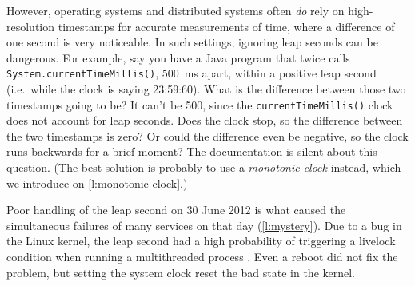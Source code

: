 However, operating systems and distributed systems often \emph{do} rely on high-resolution timestamps for accurate measurements of time, where a difference of one second is very noticeable.
In such settings, ignoring leap seconds can be dangerous.
For example, say you have a Java program that twice calls \verb|System.currentTimeMillis()|, 500~ms apart, within a positive leap second (i.e.\ while the clock is saying 23:59:60).
What is the difference between those two timestamps going to be?
It can't be 500, since the \verb|currentTimeMillis()| clock does not account for leap seconds.
Does the clock stop, so the difference between the two timestamps is zero?
Or could the difference even be negative, so the clock runs backwards for a brief moment?
The documentation is silent about this question.
(The best solution is probably to use a \emph{monotonic clock} instead, which we introduce on \autoref{l:monotonic-clock}.)

Poor handling of the leap second on 30 June 2012 is what caused the simultaneous failures of many services on that day (\autoref{l:mystery}).
Due to a bug in the Linux kernel, the leap second had a high probability of triggering a livelock condition when running a multithreaded process \citep{Allen:2013,Minar:2012}.
Even a reboot did not fix the problem, but setting the system clock reset the bad state in the kernel.

